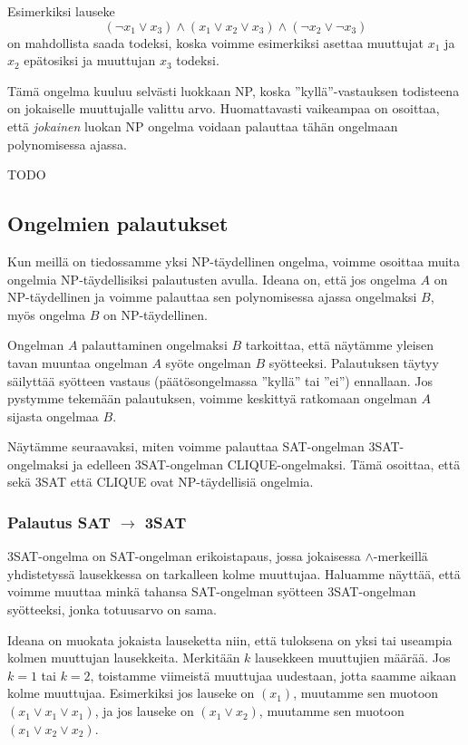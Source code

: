 Esimerkiksi lauseke
\[(\neg x_1 \lor x_3) \land (x_1 \lor x_2 \lor x_3) \land (\neg x_2 \lor \neg x_3)\]
on mahdollista saada todeksi, koska voimme esimerkiksi asettaa
muuttujat $x_1$ ja $x_2$ epätosiksi ja muuttujan $x_3$ todeksi.

Tämä ongelma kuuluu selvästi luokkaan NP, koska ''kyllä''-vastauksen
todisteena on jokaiselle muuttujalle valittu arvo.
Huomattavasti vaikeampaa on osoittaa, että \emph{jokainen} luokan
NP ongelma voidaan palauttaa tähän ongelmaan polynomisessa ajassa.

TODO

\subsection{Ongelmien palautukset}

Kun meillä on tiedossamme yksi NP-täydellinen ongelma,
voimme osoittaa muita ongelmia NP-täydellisiksi palautusten avulla.
Ideana on, että jos ongelma $A$ on NP-täydellinen ja
voimme palauttaa sen polynomisessa ajassa ongelmaksi $B$,
myös ongelma $B$ on NP-täydellinen.

Ongelman $A$ palauttaminen ongelmaksi $B$ tarkoittaa,
että näytämme yleisen tavan muuntaa ongelman $A$ syöte
ongelman $B$ syötteeksi.
Palautuksen täytyy säilyttää syötteen vastaus
(päätösongelmassa ''kyllä'' tai ''ei'') ennallaan.
Jos pystymme tekemään palautuksen, voimme keskittyä ratkomaan ongelman
$A$ sijasta ongelmaa $B$.

Näytämme seuraavaksi, miten voimme palauttaa SAT-ongelman
3SAT-ongelmaksi ja edelleen 3SAT-ongelman CLIQUE-ongelmaksi.
Tämä osoittaa, että sekä 3SAT että CLIQUE
ovat NP-täydellisiä ongelmia.

\subsubsection{Palautus SAT $\rightarrow$ 3SAT}

3SAT-ongelma on SAT-ongelman erikoistapaus, jossa jokaisessa
$\land$-merkeillä yhdistetyssä lausekkessa on tarkalleen kolme muuttujaa.
Haluamme näyttää, että voimme muuttaa minkä tahansa
SAT-ongelman syötteen 3SAT-ongelman syötteeksi,
jonka totuusarvo on sama.

Ideana on muokata jokaista lauseketta niin, 
että tuloksena on yksi tai useampia kolmen muuttujan lausekkeita.
Merkitään $k$ lausekkeen muuttujien määrää.
Jos $k=1$ tai $k=2$, toistamme viimeistä muuttujaa uudestaan,
jotta saamme aikaan kolme muuttujaa.
Esimerkiksi jos lauseke on $(x_1)$, muutamme sen muotoon
$(x_1 \lor x_1 \lor x_1)$, ja jos lauseke on $(x_1 \lor x_2)$, muutamme
sen muotoon $(x_1 \lor x_2 \lor x_2)$.

